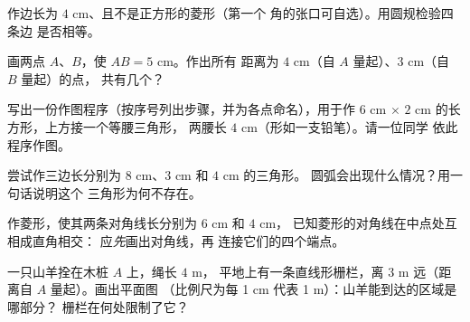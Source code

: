 \begin{exercise}[$\star$]\label{exo:g5:geometry:6}
作边长为 $4$ cm、且不是正方形的菱形（第一个
角的张口可自选）。用圆规检验四条边
是否相等。
\end{exercise}

\begin{exercise}[$\star$]\label{exo:g5:geometry:7}
画两点 $A$、$B$，使 $AB = 5$ cm。作出所有
距离为 $4$ cm（自 $A$ 量起）、$3$ cm（自 $B$ 量起）的点，
共有几个？
\end{exercise}

\begin{exercise}[$\star$]\label{exo:g5:geometry:8}
写出一份作图程序（按序号列出步骤，并为各点命名），用于作
$6$ cm $\times$ $2$ cm 的长方形，上方接一个等腰三角形，
两腰长 $4$ cm（形如一支铅笔）。请一位同学
依此程序作图。
\end{exercise}

\begin{exercise}[$\star\star$]\label{exo:g5:geometry:9}
尝试作三边长分别为 $8$ cm、$3$ cm 和 $4$ cm 的三角形。
圆弧会出现什么情况？用一句话说明这个
三角形为何不存在。
\end{exercise}

\begin{exercise}[$\star\star$]\label{exo:g5:geometry:10}
作菱形，使其两条对角线长分别为 $6$ cm 和 $4$ cm，
已知菱形的对角线在中点处互相成直角相交：
应\emph{先}画出对角线，再
连接它们的四个端点。
\end{exercise}

\begin{exercise}[$\star\star$]\label{exo:g5:geometry:11}
一只山羊拴在木桩 $A$ 上，绳长 $4$ m，
平地上有一条直线形栅栏，离 $3$ m 远（距离自 $A$ 量起）。画出平面图
（比例尺为每 1 cm 代表 1 m）：山羊能到达的区域是哪部分？
栅栏在何处限制了它？
\end{exercise}
